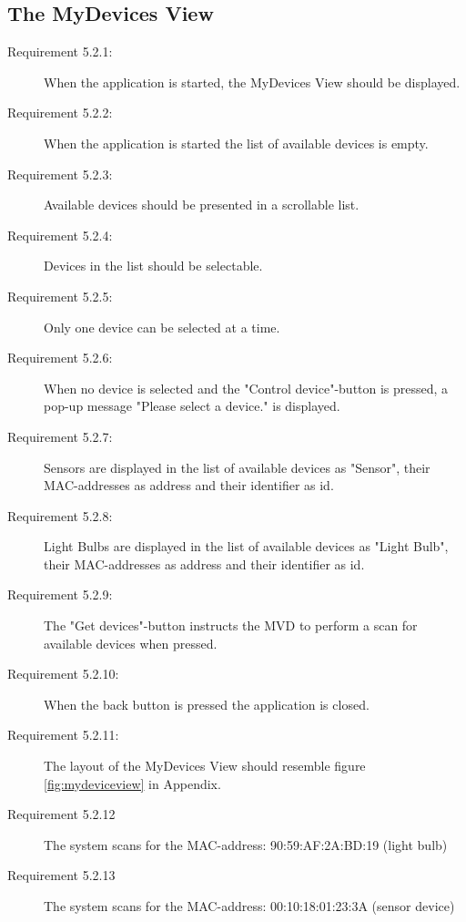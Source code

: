 \documentclass[a4paper]{article}
\begin{document}
\subsection{The MyDevices View}
\begin{description}
\item[Requirement 5.2.1:] When the application is started, the MyDevices View should be displayed.

\item[Requirement 5.2.2:] When the application is started the list of available devices is empty.

\item[Requirement 5.2.3:] Available devices should be presented in a scrollable list.

\item[Requirement 5.2.4:] Devices in the list should be selectable.

\item[Requirement 5.2.5:] Only one device can be selected at a time.

\item[Requirement 5.2.6:] When no device is selected and the "Control device"-button is pressed, a pop-up message "Please select a device." is displayed.

\item[Requirement 5.2.7:] Sensors are displayed in the list of available devices as "Sensor", their MAC-addresses as address and their identifier as id.

\item[Requirement 5.2.8:] Light Bulbs are displayed in the list of available devices as "Light Bulb", their MAC-addresses as address and their identifier as id.

\item[Requirement 5.2.9:] The "Get devices"-button instructs the MVD to perform a scan for available devices when pressed.

\item[Requirement 5.2.10:] When the back button is pressed the application is closed.

\item[Requirement 5.2.11:] The layout of the MyDevices View should resemble figure \ref{fig:mydeviceview} in Appendix.

\item[Requirement 5.2.12] The system scans for the MAC-address: 90:59:AF:2A:BD:19 (light bulb)

\item[Requirement 5.2.13] The system scans for the MAC-address: 00:10:18:01:23:3A (sensor device)


\end{description}
\end{document}
